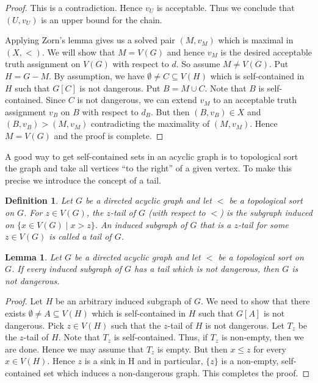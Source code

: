 \documentclass[12pt]{kluwer}
\newtheorem{lem}[thm]{Lemma}
\newtheorem{defn}{Definition}
\theoremstyle{remark}
\begin{document}
\begin{proof}
This is a contradiction.  Hence $v_U$ is acceptable.  Thus we conclude that $(U, v_U)$ is an upper bound for the chain.

Applying Zorn's lemma gives us a solved pair $(M, v_M)$ which is maximal in $(X, <)$.  We will show that $M = V(G)$ and hence $v_M$ is the desired acceptable truth assignment on $V(G)$ with respect to $d$.  So assume $M \neq V(G)$.  Put $H = G - M$.  By assumption, we have $\emptyset \neq C \subseteq V(H)$ which is self-contained in $H$ such that $G[C]$ is not dangerous.  Put $B = M \cup C$.  Note that $B$ is self-contained.  Since $C$ is not dangerous, we can extend $v_M$ to an acceptable truth assignment $v_B$ on $B$ with respect to $d_B$.  But then $(B, v_B) \in X$ and $(B, v_B) > (M, v_M)$ contradicting the maximality of $(M, v_M)$. Hence $M = V(G)$ and the proof is complete.
\end{proof}


A good way to get self-contained sets in an acyclic graph is to topological sort the graph and take all vertices ``to the right'' of a given vertex.  To make this precise we introduce the concept of a tail.

\begin{defn}
Let $G$ be a directed acyclic graph and let $<$ be a topological sort on $G$.  For $z \in V(G)$, the $z$-tail of $G$ (with respect to $<$) is the subgraph induced on $\{x \in V(G) \mid x > z\}$.  An induced subgraph of $G$ that is a $z$-tail for some $z \in V(G)$ is called a \emph{tail} of $G$.
\end{defn}

\begin{lem}\label{TailLemma}
Let $G$ be a directed acyclic graph and let $<$ be a topological sort on $G$.  If every induced subgraph of $G$ has a tail which is not dangerous, then $G$ is not dangerous.
\end{lem}
\begin{proof}
Let $H$ be an arbitrary induced subgraph of $G$.  We need to show that there exists $\emptyset \neq A \subseteq V(H)$ which is self-contained in $H$ such that $G[A]$ is not dangerous.  Pick $z \in V(H)$ such that the $z$-tail of $H$ is not dangerous.  Let $T_z$ be the $z$-tail of $H$.  Note that $T_z$ is self-contained.  Thus, if $T_z$ is non-empty, then we are done.  Hence we may assume that $T_z$ is empty.  But then $x \leq z$ for every $x \in V(H)$.  Hence $z$ is a sink in H and in particular, $\{z\}$ is a non-empty, self-contained set which induces a non-dangerous graph.  This completes the proof.
\end{proof}
\end{document}
